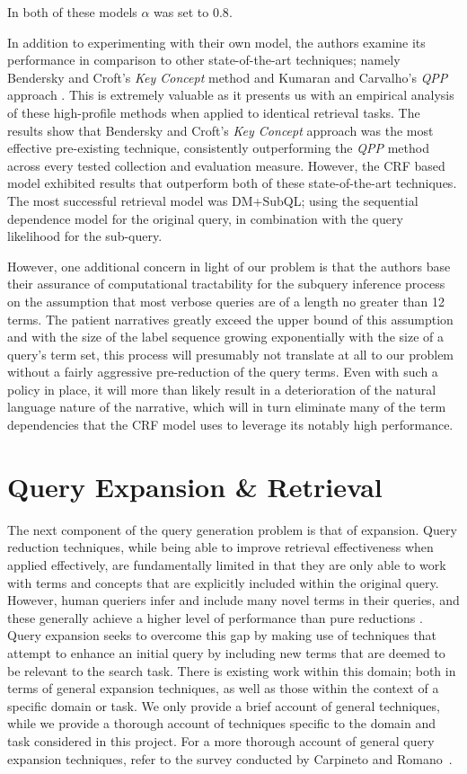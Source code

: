 \documentclass[a4paper]{report}
\begin{document}
In both of these models $\alpha$ was set to $0.8$.

In addition to experimenting with their own model, the authors examine its performance in comparison to other state-of-the-art techniques; namely Bendersky and Croft's \textit{Key Concept} method \citep{Bendersky:2008:DKC:1390334.1390419} and Kumaran and Carvalho's \textit{QPP} approach \citep{Kumaran2009Reducing-Long-Q}. This is extremely valuable as it presents us with an empirical analysis of these high-profile methods when applied to identical retrieval tasks. The results show that Bendersky and Croft's \textit{Key Concept} approach was the most effective pre-existing technique, consistently outperforming the \textit{QPP} method across every tested collection and evaluation measure. However, the CRF based model exhibited results that outperform both of these state-of-the-art techniques. The most successful retrieval model was DM+SubQL; using the sequential dependence model for the original query, in combination with the query likelihood for the sub-query. 

However, one additional concern in light of our problem is that the authors base their assurance of computational tractability for the subquery inference process on the assumption that most verbose queries are of a length no greater than 12 terms. The patient narratives greatly exceed the upper bound of this assumption and with the size of the label sequence growing exponentially with the size of a query's term set, this process will presumably not translate at all to our problem without a fairly aggressive pre-reduction of the query terms. Even with such a policy in place, it will more than likely result in a deterioration of the natural language nature of the narrative, which will in turn eliminate many of the term dependencies that the CRF model uses to leverage its notably high performance. 


\section{Query Expansion \& Retrieval}
The next component of the query generation problem is that of expansion. Query reduction techniques, while being able to improve retrieval effectiveness when applied effectively, are fundamentally limited in that they are only able to work with terms and concepts that are explicitly included within the original query. However, human queriers infer and include many novel terms in their queries, and these generally achieve a higher level of performance than pure reductions \citep{koopman2017generating}. Query expansion seeks to overcome this gap by making use of techniques that attempt to enhance an initial query by including new terms that are deemed to be relevant to the search task. There is existing work within this domain; both in terms of general expansion techniques, as well as those within the context of a specific domain or task. We only provide a brief account of general techniques, while we provide a thorough account of techniques specific to the domain and task considered in this project. For a more thorough account of general query expansion techniques, refer to the survey conducted by Carpineto and Romano~\citep{Carpineto:2012:SAQ:2071389.2071390}.
\end{document}
